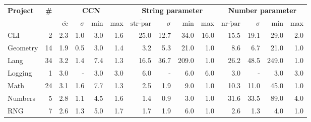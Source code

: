 \begin{tabular}{ l r | r@{\hskip 0.08in}r@{\hskip 0.08in}r@{\hskip 0.08in}r | r@{\hskip 0.08in}r@{\hskip 0.08in}r@{\hskip 0.08in}r | r@{\hskip 0.08in}r@{\hskip 0.08in}r@{\hskip 0.08in}r }
\hline 
\textbf{Project} & \textbf{\#} & \multicolumn{4}{c}{\textbf{CCN}} & \multicolumn{4}{c}{\textbf{String parameter}} & \multicolumn{4}{c}{\textbf{Number parameter}} \\ 
  &   & $\overline{\text{cc}}$ & $\sigma$ & min & max & $\overline{\text{str-par}}$ & $\sigma$ & min & max & $\overline{\text{nr-par}}$ & $\sigma$ & min & max \\ 
\hline 
CLI & 2 &2.3 &1.0 &3.0 & 1.6 &25.0 &12.7 &34.0 & 16.0 &15.5 &19.1 &29.0 & 2.0 \\ 
Geometry & 14 &1.9 &0.5 &3.0 & 1.4 &3.2 &5.3 &21.0 & 1.0 &8.6 &6.7 &21.0 & 1.0 \\ 
Lang & 34 &3.2 &1.4 &7.4 & 1.3 &16.5 &36.7 &209.0 & 1.0 &26.2 &48.5 &249.0 & 1.0 \\ 
Logging & 1 &3.0 &- &3.0 & 3.0 &6.0 &- &6.0 & 6.0 &3.0 &- &3.0 & 3.0 \\ 
Math & 24 &3.1 &1.6 &7.7 & 1.3 &2.5 &1.9 &9.0 & 1.0 &10.3 &11.0 &45.0 & 1.0 \\ 
Numbers & 5 &2.8 &1.1 &4.5 & 1.6 &1.4 &0.9 &3.0 & 1.0 &31.6 &33.5 &89.0 & 4.0 \\ 
RNG & 7 &2.6 &1.3 &5.0 & 1.7 &1.7 &1.9 &6.0 & 1.0 &2.6 &1.3 &4.0 & 1.0 \\ 
\hline 
\end{tabular}